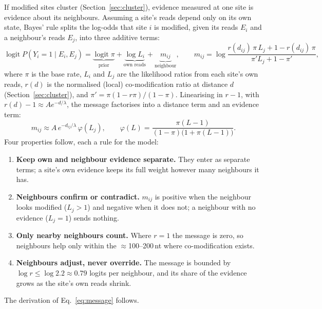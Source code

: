 \documentclass[11pt,a4paper]{article}
\begin{document}
If modified sites cluster (Section~\ref{sec:cluster}), evidence measured at one
site is evidence about its neighbours. Assuming a site's reads depend only on
its own state, Bayes' rule splits the log-odds that site $i$ is modified,
given its reads $E_i$ and a neighbour's reads $E_j$, into three additive terms:
\begin{equation}
\operatorname{logit}P(Y_i{=}1\mid E_i,E_j)=\underbrace{\operatorname{logit}\pi}_{\text{prior}}
+\underbrace{\log L_i}_{\text{own reads}}+\underbrace{m_{ij}}_{\text{neighbour}},\qquad
m_{ij}=\log\frac{r(d_{ij})\,\pi\,L_j+1-r(d_{ij})\,\pi}{\pi' L_j+1-\pi'},
\label{eq:message}
\end{equation}
where $\pi$ is the base rate, $L_i$ and $L_j$ are the likelihood ratios from
each site's own reads, $r(d)$ is the normalised (local) co-modification ratio at distance
$d$ (Section~\ref{sec:cluster}), and $\pi'=\pi(1-r\pi)/(1-\pi)$. Linearising in
$r-1$, with $r(d)-1\approx Ae^{-d/\lambda}$, the message factorises into a
distance term and an evidence term:
\begin{equation}
m_{ij}\approx A\,e^{-d_{ij}/\lambda}\,\varphi(L_j),\qquad
\varphi(L)=\frac{\pi(L-1)}{(1-\pi)\bigl(1+\pi(L-1)\bigr)}.
\label{eq:factorised}
\end{equation}
Four properties follow, each a rule for the model:
\begin{enumerate}
    \item[(i)] \textbf{Keep own and neighbour evidence separate.} They enter
    as separate terms; a site's own evidence keeps its full weight however
    many neighbours it has.
    \item[(ii)] \textbf{Neighbours confirm or contradict.} $m_{ij}$ is
    positive when the neighbour looks modified ($L_j>1$) and negative when
    it does not; a neighbour with no evidence ($L_j=1$) sends nothing.
    \item[(iii)] \textbf{Only nearby neighbours count.} Where $r=1$ the
    message is zero, so neighbours help only within the
    $\approx$100--200\,nt where co-modification exists.
    \item[(iv)] \textbf{Neighbours adjust, never override.} The message is
    bounded by $\log r\le\log2.2\approx0.79$ logits per neighbour, and its
    share of the evidence grows as the site's own reads shrink.
\end{enumerate}

The derivation of Eq.~\eqref{eq:message} follows.
\end{document}
